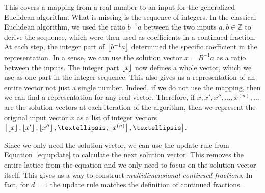 

This covers a mapping from a real number to an input for the generalized Euclidean algorithm.
What is missing is the sequence of integers.
In the classical Euclidean algorithm,
we used the ratio $b^{-1}a$ between the two inputs $a, b ∈ ℤ$ to derive the sequence,
which were then used as coefficients in a continued fraction.
At each step, the integer part of $\left\lfloor b^{-1} a\right\rfloor$ determined the specific
coefficient in the representation.
In a sense, we can use the solution vector $x = B^{-1} a$ as a ratio between the inputs.
The integer part $\left\lfloor x\right\rfloor$ now defines a whole vector, which we use as
one part in the integer sequence.
This also gives us a representation of an entire vector not just a single number.
Indeed, if we do not use the mapping, then we can find a representation for any real vector.
Therefore, if $x, x', x'', …, x^{(n)}, …$ are the solution vectors at each iteration of the algorithm,
then we represent the original input vector $x$ as a list of integer vectors
$\left[\floor{x}, \floor{x'}, \floor{x''}, …, \floor{x^{(n)}}, …\right]$.

Since we only need the solution vector,
we can use the update rule from Equation~\ref{eq:update}
to calculate the next solution vector.
This removes the entire lattice from the equation
and we only need to focus on the solution vector itself.
This gives us a way to construct \emph{multidimensional continued fractions}.
In fact, for $d = 1$ the update rule matches the definition of continued fractions.



\iffalse
\begin{figure}[tbp]
  \centering
  
  \caption{
    Different choices for the remainder of vector $c$. The original algorithm
    always uses $r$ as the remainder, but the modified update rule would also consider $r'$.}
\end{figure}
\fi

